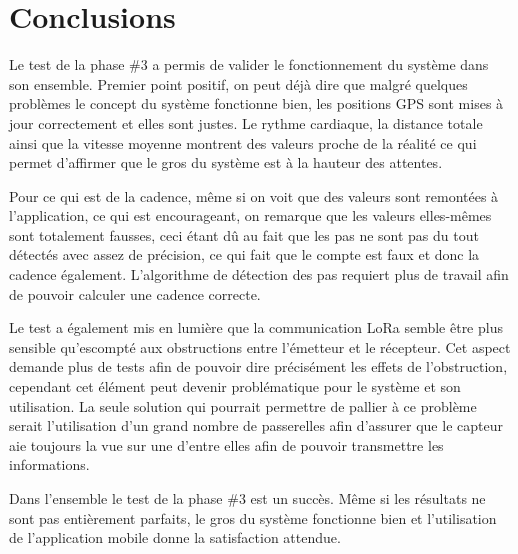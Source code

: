 \section{Conclusions}

Le test de la phase \#3 a permis de valider le fonctionnement du système dans son ensemble. Premier point positif, on peut déjà dire que malgré quelques problèmes le concept du système fonctionne bien, les positions GPS sont mises à jour correctement et elles sont justes. Le rythme cardiaque, la distance totale ainsi que la vitesse moyenne montrent des valeurs proche de la réalité ce qui permet d'affirmer que le gros du système est à la hauteur des attentes.

Pour ce qui est de la cadence, même si on voit que des valeurs sont remontées à l'application, ce qui est encourageant, on remarque que les valeurs elles-mêmes sont totalement fausses, ceci étant dû au fait que les pas ne sont pas du tout détectés avec assez de précision, ce qui fait que le compte est faux et donc la cadence également. L'algorithme de détection des pas requiert plus de travail afin de pouvoir calculer une cadence correcte.

Le test a également mis en lumière que la communication LoRa semble être plus sensible qu'escompté aux obstructions entre l'émetteur et le récepteur. Cet aspect demande plus de tests afin de pouvoir dire précisément les effets de l'obstruction, cependant cet élément peut devenir problématique pour le système et son utilisation. La seule solution qui pourrait permettre de pallier à ce problème serait l'utilisation d'un grand nombre de passerelles afin d'assurer que le capteur aie toujours la vue sur une d'entre elles afin de pouvoir transmettre les informations.

Dans l'ensemble le test de la phase \#3 est un succès. Même si les résultats ne sont pas entièrement parfaits, le gros du système fonctionne bien et l'utilisation de l'application mobile donne la satisfaction attendue.